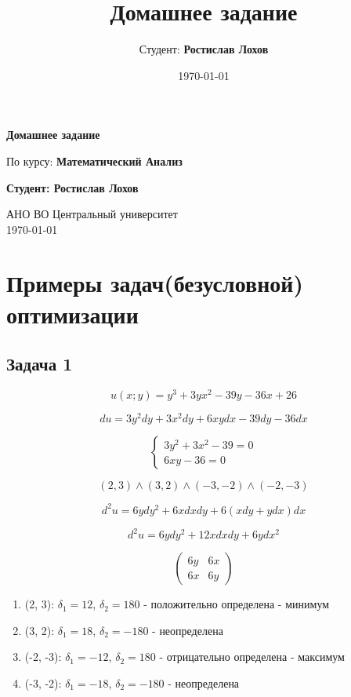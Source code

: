 \documentclass[a4paper,12pt]{article}
\title{Домашнее задание}
\author{Студент: \textbf{Ростислав Лохов}}
\date{\today}
\begin{document}
\begin{titlepage}
	\centering
	\vspace*{1cm}

	\Huge
	\textbf{Домашнее задание}

	\vspace{0.5cm}
	\LARGE
	По курсу: \textbf{Математический Анализ}

	\vspace{1.5cm}

	\textbf{Студент: Ростислав Лохов}

	\vfill

	\Large
	АНО ВО Центральный университет\\
	\vspace{0.3cm}
	\today

\end{titlepage}

\tableofcontents
\newpage

\section{Примеры задач(безусловной) оптимизации}

\subsection{Задача 1}

\[
	u(x; y) = y^3 + 3yx^2-39y-36x+26
\]

\[
	du = 3y^2 dy + 3 x^2 dy + 6 xy dx - 39dy -36dx
\]

\[
    \begin{cases}
        3y^2+3x^2-39 = 0 \\
        6xy-36 = 0
    \end{cases}
\]

\[
(2, 3) \land (3, 2) \land (-3, -2) \land (-2, -3)
\]

\[
	d^2u = 6ydy^2 + 6xdxdy + 6(xdy+ydx)dx 
\]

\[
d^2u = 6ydy^2+12x dxdy+ 6y dx^2
\]

\[
\begin{pmatrix}
	6y & 6x \\
	6x & 6y
\end{pmatrix}
\]

\begin{enumerate}
	\item (2, 3): $\delta_1 = 12$, $\delta_2 = 180$ - положительно определена - минимум
	\item (3, 2): $\delta_1 = 18$, $\delta_2 = -180$ - неопределена
	\item (-2, -3): $\delta_1 = -12$, $\delta_2 = 180$ - отрицательно определена - максимум
	\item (-3, -2): $\delta_1 = -18$, $\delta_2 = -180$ - неопределена
\end{enumerate}
\end{document}
